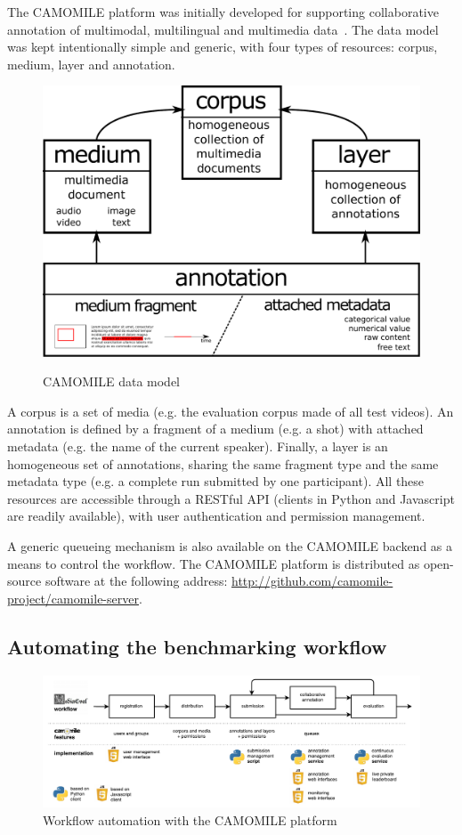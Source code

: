 \documentclass[10pt, a4paper]{article}
\begin{document}
The CAMOMILE platform was initially developed for supporting collaborative
annotation of multimodal, multilingual and multimedia data~\cite{Poignant2016b}.
The data model was kept intentionally simple and generic, with four types of resources:
corpus, medium, layer and annotation.

\begin{figure}[htb]
\center
\includegraphics[width=0.8\linewidth]{figs/model.pdf}
\label{fig:model}
\caption{CAMOMILE data model}
\end{figure}

A corpus is a set of media (e.g. the
evaluation corpus made of all test videos). An annotation is defined by a
fragment of a medium (e.g. a shot) with attached metadata (e.g. the name
of the current speaker). Finally, a layer is an homogeneous set of annotations,
sharing the same fragment type and the same metadata type (e.g. a complete run
submitted by one participant). All these resources are accessible through a
RESTful API (clients in Python and Javascript are readily available), with user
authentication and permission management.

A generic queueing mechanism is also
available on the CAMOMILE backend as a means to control the workflow. The
CAMOMILE platform is distributed as open-source software at the following
address: \url{http://github.com/camomile-project/camomile-server}.

\subsection{Automating the benchmarking workflow}

\begin{figure}[htb]
 \center
 \includegraphics[width=1\linewidth]{figs/workflow.pdf}
 \centering
 \caption {Workflow automation with the CAMOMILE platform}
 \label{fig:archi}
\end{figure}
\end{document}
